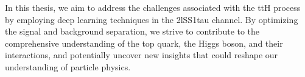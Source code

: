 In this thesis, we aim to address the challenges associated with the ttH process by employing deep learning techniques
in the 2lSS1tau channel. By optimizing the signal and background separation, we strive to contribute to the
comprehensive understanding of the top quark, the Higgs boson, and their interactions, and potentially uncover new
insights that could reshape our understanding of particle physics.